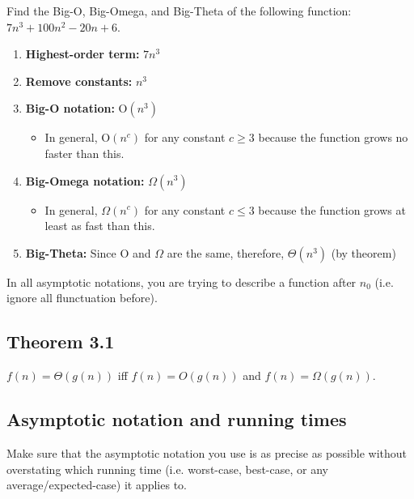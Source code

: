 \begin{example}
    Find the Big-O, Big-Omega, and Big-Theta of the following function: $7n^3 + 100n^2 - 20n + 6$. 

    \begin{enumerate}
        \item \textbf{Highest-order term:} $7n^3$
        \item \textbf{Remove constants:} $n^3$
        \item \textbf{Big-O notation:} $\text{O}(n^3)$
        \begin{itemize}
            \item In general, $\text{O}(n^c)$ for any constant $c\geq3$ because the function grows no faster than this.
        \end{itemize}
        \item \textbf{Big-Omega notation:} $\Omega (n^3)$
        \begin{itemize}
            \item In general, $\Omega (n^c)$ for any constant $c\leq3$ because the function grows at least as fast than this.
        \end{itemize}
        \item \textbf{Big-Theta:} Since O and $\Omega$ are the same, therefore, $\Theta (n^3)$ (by theorem)
    \end{enumerate}
\end{example}

\begin{intuition}
    In all asymptotic notations, you are trying to describe a function after $n_0$ (i.e. ignore all flunctuation before).
\end{intuition}

\subsection{Theorem 3.1}
    \begin{theorem}
        $f(n) = \Theta(g(n))$ iff $f(n) = O(g(n))$ and $f(n)=\Omega(g(n))$.
    \end{theorem}

\subsection{Asymptotic notation and running times}
    \begin{warning}
        Make sure that the asymptotic notation you use is as precise as possible without overstating which running time (i.e. worst-case, best-case, or any average/expected-case) it applies to.
    \end{warning}

